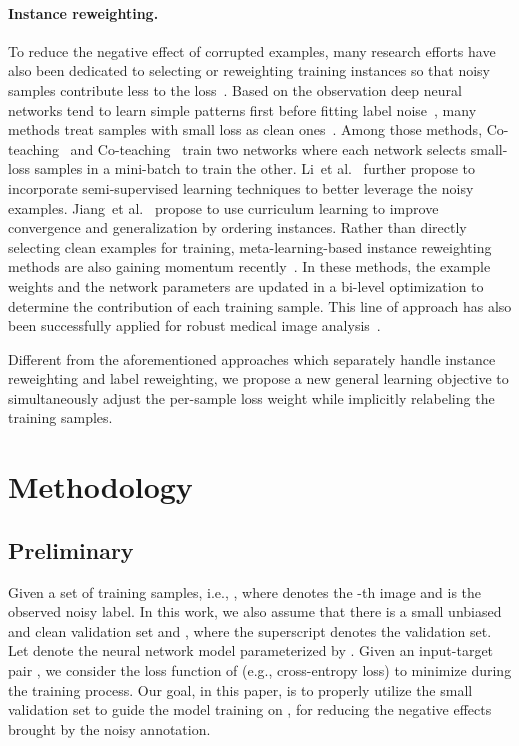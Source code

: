\documentclass{article}
\begin{document}
\paragraph{Instance reweighting.}
To reduce the negative effect of corrupted examples, many research efforts have also been dedicated to selecting or reweighting training instances so that noisy samples contribute less to the loss~\cite{jiang2018mentornet,ren2018learning,fang2020rethinking}.
Based on the observation deep neural networks tend to learn simple patterns first before fitting label noise~\cite{arpit2017closer},
many methods treat samples with small loss as clean ones~\cite{jiang2018mentornet,shen2019learning,han2018co,yu2019does,Wei_2020_CVPR}.
Among those methods,
Co-teaching~\cite{han2018co} and Co-teaching~\cite{yu2019does} train two networks where each network selects small-loss samples in a mini-batch to train the other.
Li~et al.~\cite{li2020dividemix} further propose to incorporate semi-supervised learning techniques to better leverage the noisy examples.
Jiang~et al.~\cite{jiang2018mentornet} propose to use curriculum learning to improve convergence and generalization by ordering instances.
Rather than directly selecting clean examples for training, meta-learning-based instance reweighting methods are also gaining momentum recently~\cite{ren2018learning,shu2019meta,xu2021faster}.
In these methods, the example weights and the network parameters are updated in a bi-level optimization to determine
the contribution of each training sample.
This line of approach has also been successfully applied for robust medical image analysis~\cite{xue2019robust,mirikharaji2019learning}.


Different from the aforementioned approaches which separately handle instance reweighting and label reweighting, we propose a new general learning objective to simultaneously adjust the per-sample loss weight while implicitly relabeling the training samples.


\section{Methodology}
\label{sec:method}
\subsection{Preliminary}
Given a set of  training samples, i.e., , where  denotes the -th image and  is the observed noisy label. 
In this work, we also assume that there is a small unbiased and clean validation set  and , where the superscript  denotes the validation set. 
Let  denote the neural network model parameterized by . 
Given an input-target pair , we consider the loss function of
 (e.g., cross-entropy loss) to minimize during the training process.
Our goal, in this paper, is to properly utilize the small validation set  to guide the model training on , for reducing the negative effects brought by the noisy annotation.
\end{document}
